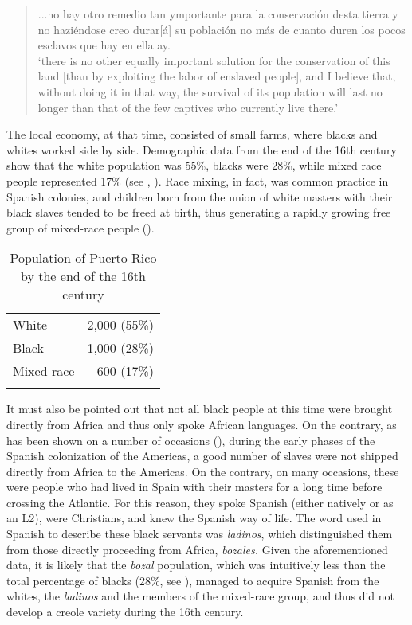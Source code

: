 \documentclass[output=paper,colorlinks,citecolor=brown]{langscibook}
\begin{document}
\begin{quote}
...no hay otro remedio tan ymportante para la conservación desta tierra y no haziéndose creo durar[á] su población no más de cuanto duren los pocos esclavos que hay en ella ay.\\`there is no other equally important solution for the conservation of this land [than by exploiting the labor of enslaved people], and I believe that, without doing it in that way, the survival of its population will last no longer than that of the few captives who currently live there.'
\end{quote}

The local economy, at that time, consisted of small farms, where blacks and whites worked side by side. Demographic data from the end of the 16th century show that the white population was 55\%, blacks were 28\%, while mixed race people represented 17\% (see , \citealt[74]{AlvarezNazario1974}). Race mixing, in fact, was common practice in Spanish colonies, and children born from the union of white masters with their black slaves tended to be freed at birth, thus generating a rapidly growing free group of mixed-race people (\citealt{Mintz1971,laurence1974caribbean}).

\begin{table}
\begin{tabular}{lr}
\lsptoprule
 {White} & 2,000 (55\%)\\
 {Black} & 1,000 (28\%)\\
 {Mixed race} & 600 (17\%)\\
\lspbottomrule
\end{tabular}
\caption{Population of Puerto Rico by the end of the 16th century\label{tab:visconti:4}}
\end{table}

It must also be pointed out that not all black people at this time were brought directly from Africa and thus only spoke African languages. On the contrary, as has been shown on a number of occasions (\citealt{Palmer1976,Restall2000,Brockington2006}), during the early phases of the Spanish colonization of the Americas, a good number of slaves were not shipped directly from Africa to the Americas. On the contrary, on many occasions, these were people who had lived in Spain with their masters for a long time before crossing the Atlantic. For this reason, they spoke Spanish (either natively or as an L2), were Christians, and knew the Spanish way of life. The word used in Spanish to describe these black servants was \textit{ladinos}, which distinguished them from those directly proceeding from Africa, \textit{bozales.} Given the aforementioned data, it is likely that the \textit{bozal} population, which was intuitively less than the total percentage of blacks (28\%, see ), managed to acquire Spanish from the whites, the \textit{ladinos} and the members of the mixed-race group, and thus did not develop a creole variety during the 16th century.
\end{document}

